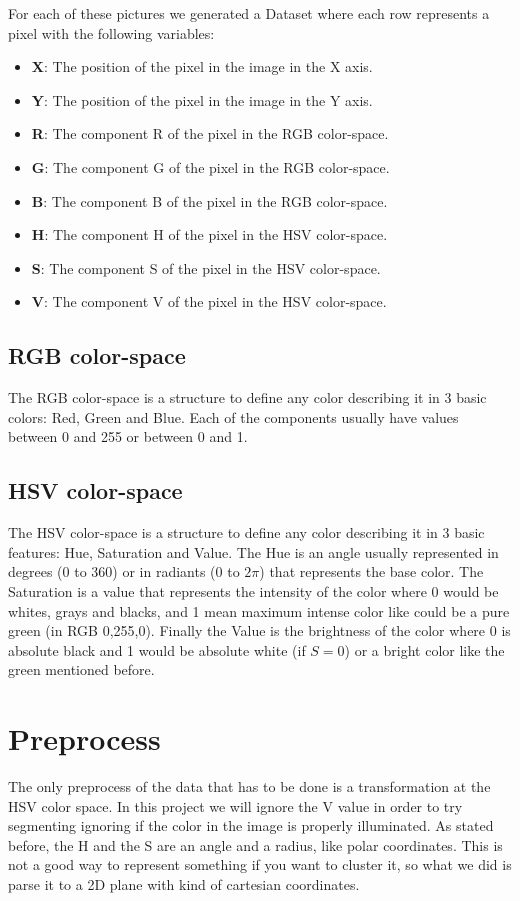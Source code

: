\documentclass[sigconf,authorversion]{acmart}
\begin{document}
For each of these pictures we generated a Dataset where each row represents a pixel with the following variables:
\begin{itemize}
  \item \textbf{X}: The position of the pixel in the image in the X axis.
  \item \textbf{Y}: The position of the pixel in the image in the Y axis.
  \item \textbf{R}: The component R of the pixel in the RGB color-space.
  \item \textbf{G}: The component G of the pixel in the RGB color-space.
  \item \textbf{B}: The component B of the pixel in the RGB color-space.
  \item \textbf{H}: The component H of the pixel in the HSV color-space.
  \item \textbf{S}: The component S of the pixel in the HSV color-space.
  \item \textbf{V}: The component V of the pixel in the HSV color-space.
\end{itemize}

\subsection{RGB color-space}
The RGB color-space is a structure to define any color describing it in 3 basic colors: Red, Green and Blue. Each of the components usually have values between 0 and 255 or between 0 and 1.

\subsection{HSV color-space}
The HSV color-space is a structure to define any color describing it in 3 basic features: Hue, Saturation and Value. The Hue is an angle usually represented in degrees (0 to 360) or in radiants (0 to $2\pi$) that represents the base color. The Saturation is a value that represents the intensity of the color where 0 would be whites, grays and blacks, and 1 mean maximum intense color like could be a pure green (in RGB 0,255,0). Finally the Value is the brightness of the color where 0 is absolute black and 1 would be absolute white (if $S=0$) or a bright color like the green mentioned before.

\section{Preprocess}
The only preprocess of the data that has to be done is a transformation at the HSV color space. In this project we will ignore the V value in order to try segmenting ignoring if the color in the image is properly illuminated. As stated before, the H and the S are an angle and a radius, like polar coordinates. This is not a good way to represent something if you want to cluster it, so what we did is parse it to a 2D plane with kind of cartesian coordinates.
\end{document}
